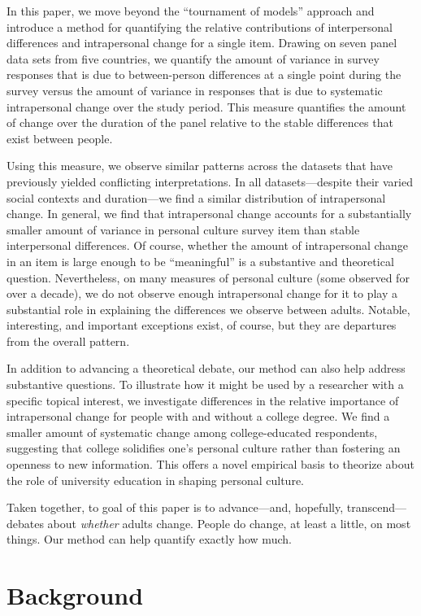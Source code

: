 \documentclass[
  12pt,
]{article}
\begin{document}
In this paper, we move beyond the ``tournament of models'' approach and
introduce a method for quantifying the relative contributions of
interpersonal differences and intrapersonal change for a single item.
Drawing on seven panel data sets from five countries, we quantify the
amount of variance in survey responses that is due to between-person
differences at a single point during the survey versus the amount of
variance in responses that is due to systematic intrapersonal change
over the study period. This measure quantifies the amount of change over
the duration of the panel relative to the stable differences that exist
between people.

Using this measure, we observe similar patterns across the datasets that
have previously yielded conflicting interpretations. In all
datasets---despite their varied social contexts and duration---we find a
similar distribution of intrapersonal change. In general, we find that
intrapersonal change accounts for a substantially smaller amount of
variance in personal culture survey item than stable interpersonal
differences. Of course, whether the amount of intrapersonal change in an
item is large enough to be ``meaningful'' is a substantive and
theoretical question. Nevertheless, on many measures of personal culture
(some observed for over a decade), we do not observe enough
intrapersonal change for it to play a substantial role in explaining the
differences we observe between adults. Notable, interesting, and
important exceptions exist, of course, but they are departures from the
overall pattern.

In addition to advancing a theoretical debate, our method can also help
address substantive questions. To illustrate how it might be used by a
researcher with a specific topical interest, we investigate differences
in the relative importance of intrapersonal change for people with and
without a college degree. We find a smaller amount of systematic change
among college-educated respondents, suggesting that college solidifies
one's personal culture rather than fostering an openness to new
information. This offers a novel empirical basis to theorize about the
role of university education in shaping personal culture.

Taken together, to goal of this paper is to advance---and, hopefully,
transcend---debates about \emph{whether} adults change. People do
change, at least a little, on most things. Our method can help quantify
exactly how much.

\hypertarget{background}{%
\section{Background}\label{background}}
\end{document}
